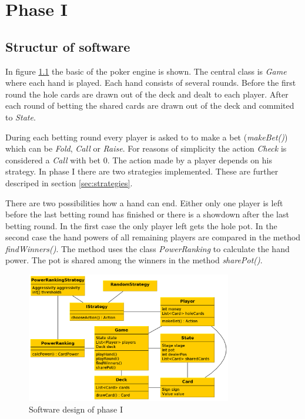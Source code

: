 \chapter{Phase I}

\section{Structur of software}
In figure \ref{fig:phase1} the basic of the poker engine is shown. The central class is \emph{Game} where each hand is played. Each hand consists of several rounds. Before the first round the hole cards are drawn out of the deck and dealt to each player. After each round of betting the shared cards are drawn out of the deck and commited to \emph{State}.

During each betting round every player is asked to to make a bet (\emph{makeBet()}) which can be \emph{Fold}, \emph{Call} or \emph{Raise}. For reasons of simplicity the action \emph{Check} is considered a \emph{Call} with bet 0. The action made by a player depends on his strategy. In phase I there are two strategies implemented. These are further descriped in section \ref{sec:strategies}.

There are two possibilities how a hand can end. Either only one player is left before the last betting round has finished or there is a showdown after the last betting round. In the first case the only player left gets the hole pot. In the second case the hand powers of all remaining players are compared in the method \emph{findWinners()}. The method uses the class \emph{PowerRanking} to calculate the hand power. The pot is shared among the winners in the method \emph{sharePot()}.

\begin{figure}[h]
  \centering
  \includegraphics[width=0.8\textwidth]{images/phase1}
  \caption{Software design of phase I}
  \label{fig:phase1}
\end{figure}

